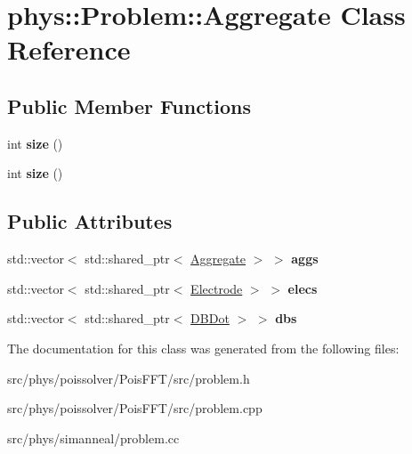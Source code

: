 \hypertarget{classphys_1_1Problem_1_1Aggregate}{}\section{phys\+:\+:Problem\+:\+:Aggregate Class Reference}
\label{classphys_1_1Problem_1_1Aggregate}
\subsection*{Public Member Functions}
\begin{DoxyCompactItemize}
\item 
int {\bfseries size} ()\hypertarget{classphys_1_1Problem_1_1Aggregate_a061ad837340bf2d107d385eb319b8a48}{}\label{classphys_1_1Problem_1_1Aggregate_a061ad837340bf2d107d385eb319b8a48}

\item 
int {\bfseries size} ()\hypertarget{classphys_1_1Problem_1_1Aggregate_ad7b5e804474b5e3de6c748d59c613982}{}\label{classphys_1_1Problem_1_1Aggregate_ad7b5e804474b5e3de6c748d59c613982}

\end{DoxyCompactItemize}
\subsection*{Public Attributes}
\begin{DoxyCompactItemize}
\item 
std\+::vector$<$ std\+::shared\+\_\+ptr$<$ \hyperlink{classphys_1_1Problem_1_1Aggregate}{Aggregate} $>$ $>$ {\bfseries aggs}\hypertarget{classphys_1_1Problem_1_1Aggregate_a0c80bc69fa3507ca06b362524eaabcb8}{}\label{classphys_1_1Problem_1_1Aggregate_a0c80bc69fa3507ca06b362524eaabcb8}

\item 
std\+::vector$<$ std\+::shared\+\_\+ptr$<$ \hyperlink{structphys_1_1Problem_1_1Electrode}{Electrode} $>$ $>$ {\bfseries elecs}\hypertarget{classphys_1_1Problem_1_1Aggregate_afe1fcf506ee6e63113cd4e9a2d657d3f}{}\label{classphys_1_1Problem_1_1Aggregate_afe1fcf506ee6e63113cd4e9a2d657d3f}

\item 
std\+::vector$<$ std\+::shared\+\_\+ptr$<$ \hyperlink{structphys_1_1Problem_1_1DBDot}{D\+B\+Dot} $>$ $>$ {\bfseries dbs}\hypertarget{classphys_1_1Problem_1_1Aggregate_adf0acc575613929ea2db999e639c75e4}{}\label{classphys_1_1Problem_1_1Aggregate_adf0acc575613929ea2db999e639c75e4}

\end{DoxyCompactItemize}


The documentation for this class was generated from the following files\+:\begin{DoxyCompactItemize}
\item 
src/phys/poissolver/\+Pois\+F\+F\+T/src/problem.\+h\item 
src/phys/poissolver/\+Pois\+F\+F\+T/src/problem.\+cpp\item 
src/phys/simanneal/problem.\+cc\end{DoxyCompactItemize}
